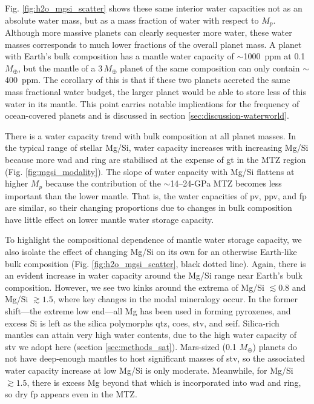 \documentclass[fleqn,usenatbib]{mnras}
\begin{document}
Fig. \ref{fig:h2o_mgsi_scatter} shows these same interior water capacities not as an absolute water mass, but as a mass fraction of water with respect to $M_p$. Although more massive planets can clearly sequester more water, these water masses corresponds to much lower fractions of the overall planet mass. A planet with Earth's bulk composition has a mantle water capacity of $\sim$1000~ppm at 0.1 $M_\oplus$, but the mantle of a $3\,M_\oplus$ planet of the same composition can only contain $\sim$400~ppm. The corollary of this is that if these two planets accreted the same mass fractional water budget, the larger planet would be able to store less of this water in its mantle. This point carries notable implications for the frequency of ocean-covered planets and is discussed in section \ref{sec:discussion-waterworld}.  %

There is a water capacity trend with bulk composition at all planet masses. In the typical range of stellar Mg/Si, water capacity increases with increasing Mg/Si because more wad and ring are stabilised at the expense of gt in the MTZ region (Fig. \ref{fig:mgsi_modality}). The slope of water capacity with Mg/Si flattens at higher $M_p$ because the contribution of the $\sim$14--24-GPa MTZ becomes less important than the lower mantle. That is, the water capacities of pv, ppv, and fp are similar, so their changing proportions due to changes in bulk composition have little effect on lower mantle water storage capacity.

To highlight the compositional dependence of mantle water storage capacity, we also isolate the effect of changing Mg/Si on its own for an otherwise Earth-like bulk composition (Fig. \ref{fig:h2o_mgsi_scatter}, black dotted line). Again, there is an evident increase in water capacity around the Mg/Si range near Earth's bulk composition. However, we see two kinks around the extrema of Mg/Si $\lesssim 0.8$ and Mg/Si $\gtrsim 1.5$, where key changes in the modal mineralogy occur. In the former shift---the extreme low end---all Mg has been used in forming pyroxenes, and excess Si is left as the silica polymorphs qtz, coes, stv, and seif. Silica-rich mantles can attain very high water contents, due to the high water capacity of stv we adopt here (section \ref{sec:methods_sat}). Mars-sized (0.1 $M_\oplus$) planets do not have deep-enough mantles to host significant masses of stv, so the associated water capacity increase at low Mg/Si is only moderate. Meanwhile, for Mg/Si $\gtrsim1.5$, there is excess Mg beyond that which is incorporated into wad and ring, so dry fp appears even in the MTZ.
\end{document}
